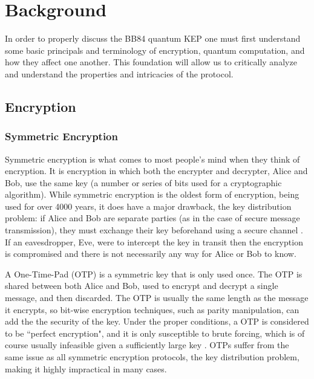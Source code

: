 \chapter{Background}
\label{chap:background}

In order to properly discuss the BB84 quantum KEP one must first understand some basic principals and terminology of encryption, quantum computation, and how they affect one another. 
This foundation will allow us to critically analyze and understand the properties and intricacies of the protocol.

\section{Encryption}
\subsection{Symmetric Encryption}
Symmetric encryption is what comes to most people's mind when they think of encryption.
It is encryption in which both the encrypter and decrypter, Alice and Bob, use the same key (a number or series of bits used for a cryptographic algorithm).
While symmetric encryption is the oldest form of encryption, being used for over 4000 years, it does have a major drawback, the key distribution problem: if Alice and Bob are separate parties (as in the case of secure message transmission), they must exchange their key beforehand using a secure channel \cite{cryptography}.
If an eavesdropper, Eve, were to intercept the key in transit then the encryption is compromised and there is not necessarily any way for Alice or Bob to know.

A One-Time-Pad (OTP) is a symmetric key that is only used once.
The OTP is shared between both Alice and Bob, used to encrypt and decrypt a single message, and then discarded.
The OTP is usually the same length as the message it encrypts, so bit-wise encryption techniques, such as parity manipulation, can add the the security of the key.
Under the proper conditions, a OTP is considered to be ``perfect encryption", and it is only susceptible to brute forcing, which is of course usually infeasible given a sufficiently large key \cite{cryptography}.
OTPs suffer from the same issue as all symmetric encryption protocols, the key distribution problem, making it highly impractical in many cases.

